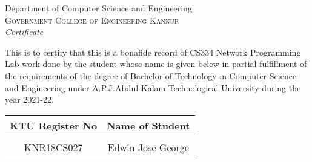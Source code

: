 \newpage
\thispagestyle{empty}
\vspace*{\fill}
\begin{onehalfspace}
\begin{center}

	\huge{Department of Computer Science and Engineering}\\[0.5cm]
	\normalsize \textsc{Government College of Engineering Kannur}\\[2.0cm]

	\emph{\LARGE Certificate}\\[1.0cm]
\end{center}

\normalsize This is to certify that this is a bonafide record of CS334 Network Programming Lab work done by the student whose name is given below in partial fulfillment of the requirements of the degree of Bachelor of Technology in Computer Science and Engineering under A.P.J.Abdul Kalam Technological University during the year 2021-22.\\[1.0cm]

\begin{table}[h]
	\centering
	\begin{tabular}{cc}
		KTU Register No & Name of Student
		\\ \hline \\
		KNR18CS027      & Edwin Jose George
	\end{tabular}
\end{table}


\begin{table}[h]
	\centering
\end{table}
\end{onehalfspace}
\vspace*{\fill}
